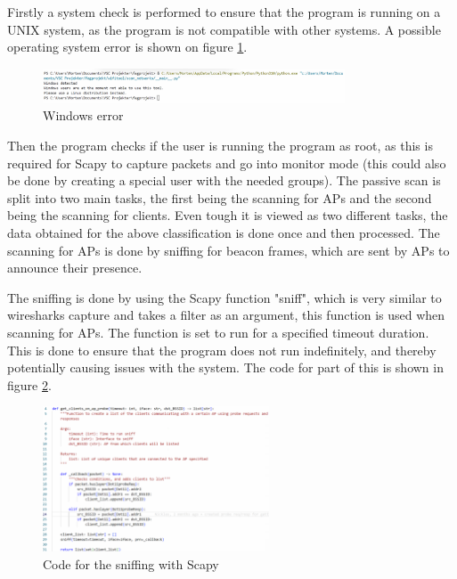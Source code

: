Firstly a system check is performed to ensure that the program is running on a UNIX system, as the program is not compatible with other systems. A possible operating system error is shown on figure \ref{W_error}.

\begin{figure}[!htbp]
    \centering
    \includegraphics[width=0.8\textwidth]{Latex-Files/Billeder/Implementation/Windows_error.png}
    \caption{Windows error}
    \label{W_error}
\end{figure}

Then the program checks if the user is running the program as root, as this is required for Scapy to capture packets and go into monitor mode (this could also be done by creating a special user with the needed groups). The passive scan is split into two main tasks, the first being the scanning for APs and the second being the scanning for clients. 
Even tough it is viewed as two different tasks, the data obtained for the above classification is done once and then processed.
The scanning for APs is done by sniffing for beacon frames, which are sent by APs to announce their presence.

The sniffing is done by using the Scapy function "sniff", which is very similar to wiresharks capture and takes a filter as an argument, this function is used when scanning for APs. The function is set to run for a specified timeout duration. This is done to ensure that the program does not run indefinitely, and thereby potentially causing issues with the system. The code for part of this is shown in figure \ref{Scan1}.
\begin{figure}[!htbp]
    \centering
    \includegraphics[width=0.6\textwidth]{Latex-Files/Billeder/Implementation/AP_Scan.png}
    \caption{Code for the sniffing with Scapy}
    \label{Scan1}
\end{figure}

